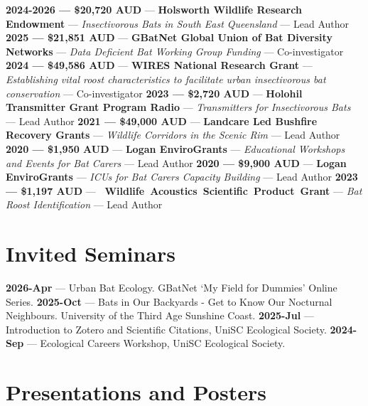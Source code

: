\documentclass[
]{article}
\begin{document}
\textbf{2024-2026 --- \$20,720 AUD} --- \textbf{Holsworth Wildlife
Research Endowment} --- \emph{Insectivorous Bats in South East
Queensland} --- Lead Author \textbf{2025 --- \$21,851 AUD} ---
\textbf{GBatNet Global Union of Bat Diversity Networks} --- \emph{Data
Deficient Bat Working Group Funding} --- Co-investigator \textbf{2024
--- \$49,586 AUD} --- \textbf{WIRES National Research Grant} ---
\emph{Establishing vital roost characteristics to facilitate urban
insectivorous bat conservation} --- Co-investigator \textbf{2023 ---
\$2,720 AUD} --- \textbf{Holohil Transmitter Grant Program Radio} ---
\emph{Transmitters for Insectivorous Bats} --- Lead Author \textbf{2021
--- \$49,000 AUD} --- \textbf{Landcare Led Bushfire Recovery Grants} ---
\emph{Wildlife Corridors in the Scenic Rim} --- Lead Author \textbf{2020
--- \$1,950 AUD} --- \textbf{Logan EnviroGrants} --- \emph{Educational
Workshops and Events for Bat Carers} --- Lead Author \textbf{2020 ---
\$9,900 AUD} --- \textbf{Logan EnviroGrants} --- \emph{ICUs for Bat
Carers Capacity Building} --- Lead Author \textbf{2023 --- \$1,197 AUD}
--- \textbf{~Wildlife~Acoustics~Scientific~Product~Grant} --- \emph{Bat
Roost Identification} --- Lead Author

\section{Invited Seminars}\label{invited-seminars}

\textbf{2026-Apr} --- Urban Bat Ecology. GBatNet `My Field for Dummies'
Online Series. \textbf{2025-Oct} --- Bats in Our Backyards - Get to Know
Our Nocturnal Neighbours. University of the Third Age Sunshine Coast.
\textbf{2025-Jul} --- Introduction to Zotero and Scientific Citations,
UniSC Ecological Society. \textbf{2024-Sep} --- Ecological Careers
Workshop, UniSC Ecological Society.

\section{Presentations and Posters}\label{presentations-and-posters}
\end{document}
